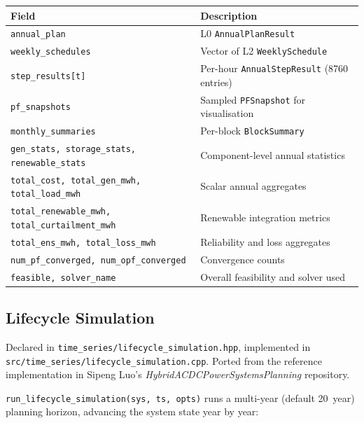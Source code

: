 \begin{center}
\begin{tabular}{ll}
\hline\hline
\textbf{Field} & \textbf{Description} \\
\hline
\texttt{annual\_plan} & L0 \texttt{AnnualPlanResult} \\
\texttt{weekly\_schedules} & Vector of L2 \texttt{WeeklySchedule} \\
\texttt{step\_results[t]} & Per-hour \texttt{AnnualStepResult} (8760 entries) \\
\texttt{pf\_snapshots} & Sampled \texttt{PFSnapshot} for visualisation \\
\texttt{monthly\_summaries} & Per-block \texttt{BlockSummary} \\
\texttt{gen\_stats, storage\_stats, renewable\_stats} & Component-level annual statistics \\
\texttt{total\_cost, total\_gen\_mwh, total\_load\_mwh} & Scalar annual aggregates \\
\texttt{total\_renewable\_mwh, total\_curtailment\_mwh} & Renewable integration metrics \\
\texttt{total\_ens\_mwh, total\_loss\_mwh} & Reliability and loss aggregates \\
\texttt{num\_pf\_converged, num\_opf\_converged} & Convergence counts \\
\texttt{feasible, solver\_name} & Overall feasibility and solver used \\
\hline\hline
\end{tabular}
\end{center}

\subsection{Lifecycle Simulation}
\label{sec:lifecycle-sim}

Declared in \texttt{time\_series/lifecycle\_simulation.hpp},
implemented in \texttt{src/time\_series/lifecycle\_simulation.cpp}.
Ported from the reference implementation in Sipeng Luo's
\textit{HybridACDCPowerSystemsPlanning} repository.

\texttt{run\_lifecycle\_simulation(sys, ts, opts)} runs a multi-year (default
20~year) planning horizon, advancing the system state year by year:


